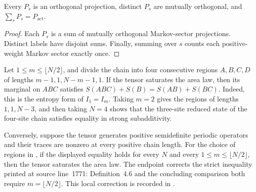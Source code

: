 \begin{lemma}
    \label{thm:mpdo_bnt_sector_projection_resolution}
    \leanok
    Every $P_s$ is an orthogonal projection, distinct $P_s$ are mutually
    orthogonal, and $\sum_s P_s=P_{\mathrm{act}}$.
\end{lemma}

\begin{proof}\leanok
    Each $P_s$ is a sum of mutually orthogonal Markov-sector projections.
    Distinct labels have disjoint sums. Finally, summing over $s$ counts each
    positive-weight Markov sector exactly once.
\end{proof}

\begin{lemma}
    \label{thm:mpdo_sal_ssa_equality}
    \leanok
    Let $1\leq m\leq\lfloor N/2\rfloor$, and divide the chain into four
    consecutive regions $A,B,C,D$ of lengths $m-1,1,N-m-1,1$. If the tensor
    saturates the area law, then its marginal on $ABC$ satisfies
    $S(ABC)+S(B)=S(AB)+S(BC)$. Indeed, this is the entropy form of
    $I_1=I_m$. Taking $m=2$ gives the regions of lengths $1,1,N-3$, and then
    taking $N=4$ shows that the three-site reduced state of the four-site
    chain satisfies equality in strong subadditivity.

    Conversely, suppose the tensor generates positive semidefinite periodic
    operators and their traces are nonzero at every positive chain length.
    For the choice of regions in
    \cite[Appendix~C.2, lines~1760--1780]{Cirac2016MPDO_arXiv}, if the
    displayed equality holds for every $N$ and every
    $1\leq m\leq\lfloor N/2\rfloor$, then the tensor saturates the area law.
    The endpoint corrects the strict inequality printed at source line~1771:
    Definition~4.6 and the concluding comparison both require
    $m=\lfloor N/2\rfloor$. This local correction is recorded in
    \cite{gap:cpgsv17_mpdo_sal_zcl_eta_local_structure}.
\end{lemma}

